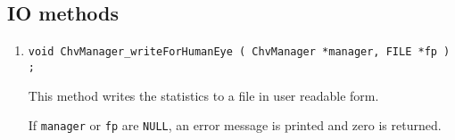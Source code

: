 \subsection{IO methods}
\label{subsection:ChvManager:proto:IO}
\par
\begin{enumerate}
\item
\begin{verbatim}
void ChvManager_writeForHumanEye ( ChvManager *manager, FILE *fp ) ;
\end{verbatim}
\par
This method writes the statistics to a file in user readable form.
\par {}
If {\tt manager} or {\tt fp} are {\tt NULL},
an error message is printed and zero is returned.
\end{enumerate}
